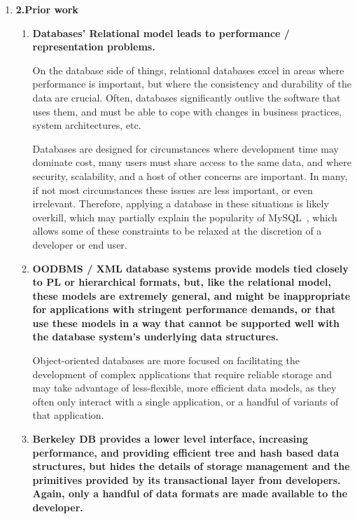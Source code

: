 \documentclass[letterpaper,english]{article}
\begin{document}
\begin{enumerate}
\begin{enumerate}
\end{enumerate}
\item {\bf 2.Prior work}

\begin{enumerate}

  \item{\bf Databases' Relational model leads to performance /
  representation problems.}

On the database side of things, relational databases excel in areas
where performance is important, but where the consistency and
durability of the data are crucial.  Often, databases significantly
outlive the software that uses them, and must be able to cope with
changes in business practices, system architectures,
etc.~\cite{relational}

Databases are designed for circumstances where development time may
dominate cost, many users must share access to the same data, and
where security, scalability, and a host of other concerns are
important.  In many, if not most circumstances these issues are less
important, or even irrelevant.  Therefore, applying a database in
these situations is likely overkill, which may partially explain the
popularity of MySQL~\cite{mysql}, which allows some of these
constraints to be relaxed at the discretion of a developer or end
user.

  \item{\bf OODBMS / XML database systems provide models tied closely to PL
  or hierarchical formats, but, like the relational model, these
  models are extremely general, and might be inappropriate for
  applications with stringent performance demands, or that use these
  models in a way that cannot be supported well with the database
  system's underlying data structures.}

Object-oriented databases are more focused on facilitating the
development of complex applications that require reliable storage and
may take advantage of less-flexible, more efficient data models, as
they often only interact with a single application, or a handful of
variants of that application.~\cite{lamb}

  \item{\bf Berkeley DB provides a lower level interface, increasing
  performance, and providing efficient tree and hash based data
  structures, but hides the details of storage management and the
  primitives provided by its transactional layer from
  developers. Again, only a handful of data formats are made available
  to the developer.}


\end{enumerate}
\end{enumerate}
\end{document}
